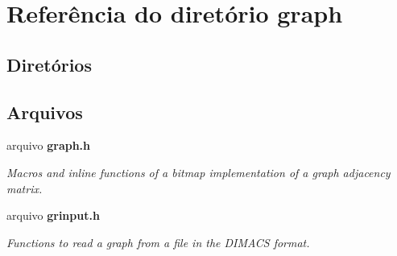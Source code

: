 \section{Referência do diretório graph}
\label{dir_12552d7fa429bf94a2e32e5cf39f7e69}
\subsection*{Diretórios}
\begin{DoxyCompactItemize}
\end{DoxyCompactItemize}
\subsection*{Arquivos}
\begin{DoxyCompactItemize}
\item 
arquivo {\bf graph.\+h}
\begin{DoxyCompactList}\small\item\em Macros and inline functions of a bitmap implementation of a graph adjacency matrix. \end{DoxyCompactList}\item 
arquivo {\bf grinput.\+h}
\begin{DoxyCompactList}\small\item\em Functions to read a graph from a file in the D\+I\+M\+A\+CS format. \end{DoxyCompactList}\end{DoxyCompactItemize}
